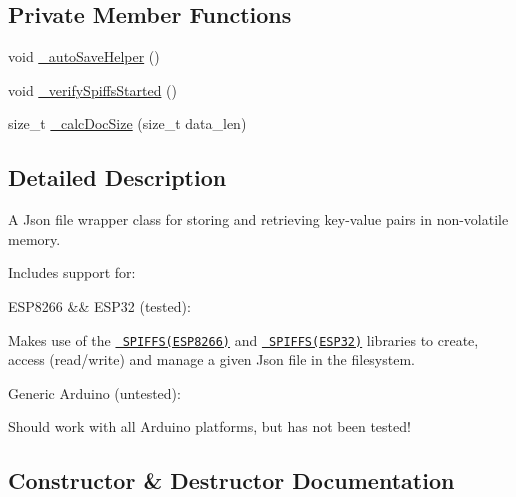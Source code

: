 \subsection*{Private Member Functions}
\begin{DoxyCompactItemize}
\item 
void \mbox{\hyperlink{class_nv_mem_json_file_dict_a328bcc8151393ca9cdf81c9cacc14a59}{\+\_\+auto\+Save\+Helper}} ()
\item 
void \mbox{\hyperlink{class_nv_mem_json_file_dict_a938c2a2e731c5fce2bea5e8dec924e60}{\+\_\+verify\+Spiffs\+Started}} ()
\item 
size\+\_\+t \mbox{\hyperlink{class_nv_mem_json_file_dict_ad5844c8a709c0f1009f47ee2baeba7e2}{\+\_\+calc\+Doc\+Size}} (size\+\_\+t data\+\_\+len)
\end{DoxyCompactItemize}


\subsection{Detailed Description}
A Json file wrapper class for storing and retrieving key-\/value pairs in non-\/volatile memory. 

Includes support for\+:


\begin{DoxyItemize}
\item E\+S\+P8266 \&\& E\+S\+P32 (tested)\+:
\begin{DoxyItemize}
\item Makes use of the \href{https://github.com/esp8266/Arduino/tree/master/cores/esp8266/spiffs}{\texttt{ S\+P\+I\+F\+F\+S(\+E\+S\+P8266)}} and \href{https://github.com/espressif/arduino-esp32/tree/master/libraries/SPIFFS}{\texttt{ S\+P\+I\+F\+F\+S(\+E\+S\+P32)}} libraries to create, access (read/write) and manage a given Json file in the filesystem.
\end{DoxyItemize}
\item Generic Arduino (untested)\+:
\begin{DoxyItemize}
\item Should work with all Arduino platforms, but has not been tested! 
\end{DoxyItemize}
\end{DoxyItemize}

\subsection{Constructor \& Destructor Documentation}
\mbox{\label{class_nv_mem_json_file_dict_aaf16ed30510b3fbce9d4ef07c445a86d}} 
